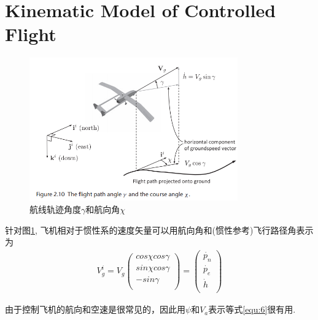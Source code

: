 \documentclass[UTF8,a4paper,10pt,nocolorlinks]{ctexart}
\begin{document}
    \section{Kinematic Model of Controlled Flight}
    \begin{figure}[htpb]
        \centering
        \includegraphics[width=0.8\textwidth]{pictures/2_10.png}
        \caption{航线轨迹角度$\gamma$和航向角$\chi$}
        \label{fig:2_10}
    \end{figure}
    针对图\ref{fig:2_10}, 飞机相对于惯性系的速度矢量可以用航向角和(惯性参考)飞行路径角表示为 
    \begin{gather} %
        V_{g}^{i} = V_{g} \begin{pmatrix}
            cos \chi cos \gamma \\
            sin \chi cos \gamma \\
            -sin \gamma \\
          \end{pmatrix}
          = \begin{pmatrix}
            \dot{p_{n}} \\
            \dot{p_{e}} \\
            \dot{h} \\
          \end{pmatrix}
          \label{equ:6}
      \end{gather}
    \par 由于控制飞机的航向和空速是很常见的，因此用$\psi$和$V_{a}$表示等式\ref{equ:6}很有用. 
\end{document}
